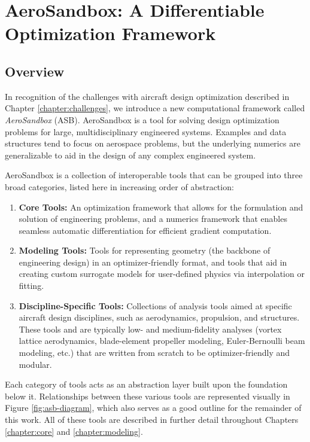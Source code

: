 \chapter{AeroSandbox: A Differentiable Optimization Framework}
\label{chapter:aerosandbox}


\section{Overview}

In recognition of the challenges with aircraft design optimization described in Chapter \ref{chapter:challenges}, we introduce a new computational framework called \textit{AeroSandbox} (ASB). AeroSandbox is a tool for solving design optimization problems for large, multidisciplinary engineered systems. Examples and data structures tend to focus on aerospace problems, but the underlying numerics are generalizable to aid in the design of any complex engineered system.

AeroSandbox is a collection of interoperable tools that can be grouped into three broad categories, listed here in increasing order of abstraction:

\begin{enumerate}
    \item \textbf{Core Tools:} An optimization framework that allows for the formulation and solution of engineering problems, and a numerics framework that enables seamless automatic differentiation for efficient gradient computation.

    \item \textbf{Modeling Tools:} Tools for representing geometry (the backbone of engineering design) in an optimizer-friendly format, and tools that aid in creating custom surrogate models for user-defined physics via interpolation or fitting.

    \item \textbf{Discipline-Specific Tools:} Collections of analysis tools aimed at specific aircraft design disciplines, such as aerodynamics, propulsion, and structures. These tools and are typically low- and medium-fidelity analyses (vortex lattice aerodynamics, blade-element propeller modeling, Euler-Bernoulli beam modeling, etc.) that are written from scratch to be optimizer-friendly and modular.

\end{enumerate}

Each category of tools acts as an abstraction layer built upon the foundation below it. Relationships between these various tools are represented visually in Figure \ref{fig:asb-diagram}, which also serves as a good outline for the remainder of this work. All of these tools are described in further detail throughout Chapters \ref{chapter:core} and \ref{chapter:modeling}. %

